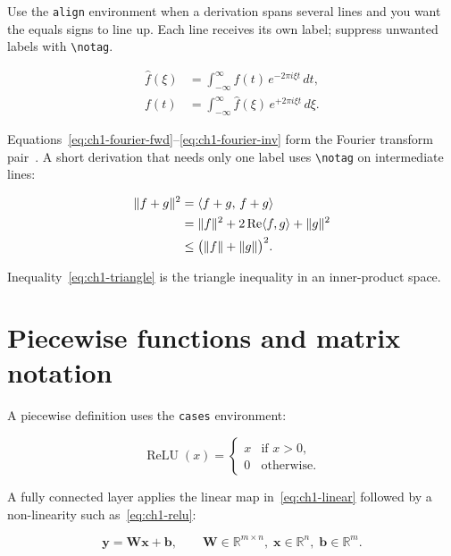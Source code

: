 Use the \texttt{align} environment when a derivation spans several
lines and you want the equals signs to line up.
Each line receives its own label; suppress unwanted labels with
\verb|\notag|.

\begin{align}
  \hat{f}(\xi) &= \int_{-\infty}^{\infty} f(t)\,
                   e^{-2\pi i \xi t}\, dt,
                   \label{eq:ch1-fourier-fwd} \\
  f(t)         &= \int_{-\infty}^{\infty} \hat{f}(\xi)\,
                   e^{+2\pi i \xi t}\, d\xi.
                   \label{eq:ch1-fourier-inv}
\end{align}

Equations~\eqref{eq:ch1-fourier-fwd}–\eqref{eq:ch1-fourier-inv}
form the Fourier transform pair~\cite{shannon1948}.
A short derivation that needs only one label uses \verb|\notag| on
intermediate lines:

\begin{align}
  \|f + g\|^{2}
    &= \langle f + g,\, f + g \rangle \notag \\
    &= \|f\|^{2} + 2\operatorname{Re}\langle f, g \rangle
       + \|g\|^{2} \notag \\
    &\leq \bigl(\|f\| + \|g\|\bigr)^{2}.
       \label{eq:ch1-triangle}
\end{align}

Inequality~\eqref{eq:ch1-triangle} is the triangle inequality in an
inner-product space.

\section{Piecewise functions and matrix notation}

A piecewise definition uses the \texttt{cases} environment:

\begin{equation}
  \operatorname{ReLU}(x) =
  \begin{cases}
    x & \text{if } x > 0, \\
    0 & \text{otherwise.}
  \end{cases}
  \label{eq:ch1-relu}
\end{equation}

A fully connected layer applies the linear map in~\eqref{eq:ch1-linear}
followed by a non-linearity such as~\eqref{eq:ch1-relu}:

\begin{equation}
  \mathbf{y} = \mathbf{W}\mathbf{x} + \mathbf{b},
  \qquad
  \mathbf{W} \in \mathbb{R}^{m \times n},\;
  \mathbf{x} \in \mathbb{R}^{n},\;
  \mathbf{b} \in \mathbb{R}^{m}.
  \label{eq:ch1-linear}
\end{equation}

